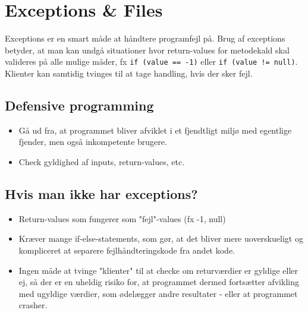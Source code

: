 \section{Exceptions \& Files}

Exceptions er en smart måde at håndtere programfejl på. Brug af exceptions betyder, at man kan undgå situationer hvor return-values for metodekald skal valideres på alle mulige måder, fx \verb|if (value == -1)| eller \verb|if (value != null)|. Klienter kan samtidig tvinges til at tage handling, hvis der sker fejl.

\subsection{Defensive programming}
\begin{itemize}
  \item Gå ud fra, at programmet bliver afviklet i et fjendtligt miljø med egentlige fjender, men også inkompetente brugere.
  \item Check gyldighed af inputs, return-values, etc.
\end{itemize}

\subsection{Hvis man ikke har exceptions?}
\begin{itemize}
  \item Return-values som fungerer som "fejl"-values (fx -1, null)
  \item Kræver mange if-else-statements, som gør, at det bliver mere uoverskueligt og kompliceret at separere fejlhåndteringskode fra andet kode.
  \item Ingen måde at tvinge "klienter" til at checke om returværdier er gyldige eller ej, så der er en uheldig risiko for, at programmet dermed fortsætter afvikling med ugyldige værdier, som ødelægger andre resultater - eller at programmet crasher.
\end{itemize}

